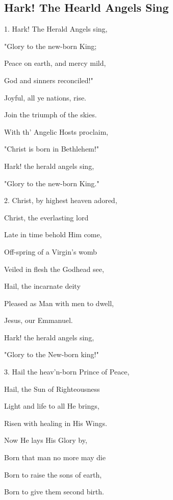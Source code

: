 \subsection{Hark! The Hearld Angels Sing}\label{hark_the_herald}
\begin{description}[nosep,leftmargin=\parindent,labelsep=0pt]
\item 1. Hark! The Herald Angels sing, 
\item "Glory to the new-born King; 
\item Peace on earth, and mercy mild, 
\item God and sinners reconciled!" 
\item Joyful, all ye nations, rise. 
\item Join the triumph of the skies. 
\item With th' Angelic Hosts proclaim, 
\item "Christ is born in Bethlehem!" 
\item Hark! the herald angels sing, 
\item "Glory to the new-born King." 
\vspace{1.5ex}
\item 2. Christ, by highest heaven adored, 
\item Christ, the everlasting lord 
\item Late in time behold Him come, 
\item Off-spring of a Virgin's womb 
\item Veiled in flesh the Godhead see, 
\item Hail, the incarnate deity 
\item Pleased as Man with men to dwell, 
\item Jesus, our Emmanuel. 
\item Hark! the herald angels sing, 
\item "Glory to the New-born king!" 
\vspace{1.5ex}
\item 3. Hail the heav'n-born Prince of Peace, 
\item Hail, the Sun of Righteousness 
\item Light and life to all He brings, 
\item Risen with healing in His Wings. 
\item Now He lays His Glory by, 
\item Born that man no more may die 
\item Born to raise the sons of earth, 
\item Born to give them second birth. 

\end{description}

